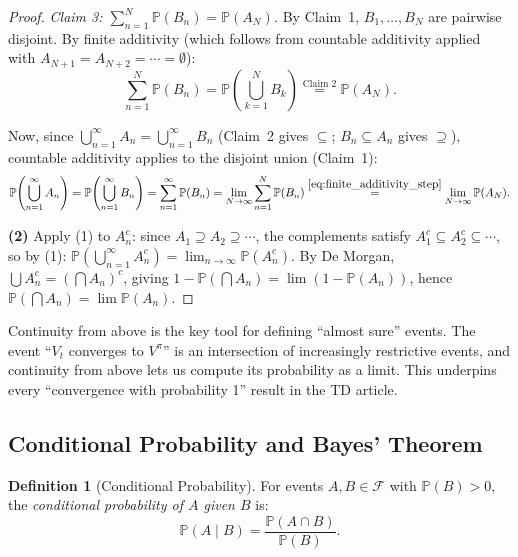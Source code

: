 \documentclass[11pt,a4paper]{article}
\theoremstyle{definition}
\newtheorem{definition}{Definition}[section]
\theoremstyle{plain}
\theoremstyle{remark}
\newcommand{\Prob}{\mathbb{P}}
\begin{document}
\begin{proof}
\medskip
\textit{Claim 3: $\sum_{n=1}^N \Prob(B_n) = \Prob(A_N)$.}
By Claim~1, $B_1, \ldots, B_N$ are pairwise disjoint. By finite additivity (which follows from countable additivity applied with $A_{N+1} = A_{N+2} = \cdots = \emptyset$):
\begin{equation}
    \sum_{n=1}^N \Prob(B_n) = \Prob\!\left(\bigcup_{k=1}^N B_k\right) \overset{\text{Claim 2}}{=} \Prob(A_N).
    \label{eq:finite_additivity_step}
\end{equation}

\medskip
Now, since $\bigcup_{n=1}^\infty A_n = \bigcup_{n=1}^\infty B_n$ (Claim~2 gives $\subseteq$; $B_n \subseteq A_n$ gives $\supseteq$), countable additivity applies to the disjoint union (Claim~1):
\begin{equation}
    \Prob\!\left(\bigcup_{n=1}^\infty A_n\right) = \Prob\!\left(\bigcup_{n=1}^\infty B_n\right) = \sum_{n=1}^\infty \Prob(B_n) = \lim_{N \to \infty} \sum_{n=1}^N \Prob(B_n) \overset{\eqref{eq:finite_additivity_step}}{=} \lim_{N \to \infty} \Prob(A_N).
\end{equation}

\textbf{(2)} Apply (1) to $A_n^c$: since $A_1 \supseteq A_2 \supseteq \cdots$, the complements satisfy $A_1^c \subseteq A_2^c \subseteq \cdots$, so by (1): $\Prob(\bigcup_{n=1}^\infty A_n^c) = \lim_{n \to \infty} \Prob(A_n^c)$. By De Morgan, $\bigcup A_n^c = (\bigcap A_n)^c$, giving $1 - \Prob(\bigcap A_n) = \lim(1 - \Prob(A_n))$, hence $\Prob(\bigcap A_n) = \lim \Prob(A_n)$.
\end{proof}

\begin{rlconnection}[Connection to RL]
Continuity from above is the key tool for defining ``almost sure'' events. The event ``$V_t$ converges to $V^\pi$'' is an intersection of increasingly restrictive events, and continuity from above lets us compute its probability as a limit. This underpins every ``convergence with probability 1'' result in the TD article.
\end{rlconnection}

\subsection{Conditional Probability and Bayes' Theorem}
\label{subsec:cond_prob}

\begin{definition}[Conditional Probability]
\label{def:cond_prob}
For events $A, B \in \mathcal{F}$ with $\Prob(B) > 0$, the \emph{conditional probability of $A$ given $B$} is:
\begin{equation}
    \Prob(A \mid B) = \frac{\Prob(A \cap B)}{\Prob(B)}.
    \label{eq:cond_prob}
\end{equation}
\end{definition}
\end{document}
